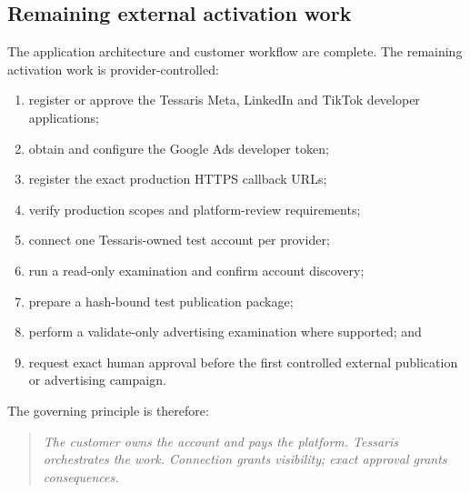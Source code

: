 \subsection{Remaining external activation work}

The application architecture and customer workflow are complete. The remaining activation work is provider-controlled:

\begin{enumerate}
    \item register or approve the Tessaris Meta, LinkedIn and TikTok developer applications;
    \item obtain and configure the Google Ads developer token;
    \item register the exact production HTTPS callback URLs;
    \item verify production scopes and platform-review requirements;
    \item connect one Tessaris-owned test account per provider;
    \item run a read-only examination and confirm account discovery;
    \item prepare a hash-bound test publication package;
    \item perform a validate-only advertising examination where supported; and
    \item request exact human approval before the first controlled external publication or advertising campaign.
\end{enumerate}

The governing principle is therefore:

\begin{quote}
\emph{The customer owns the account and pays the platform. Tessaris orchestrates the work. Connection grants visibility; exact approval grants consequences.}
\end{quote}

